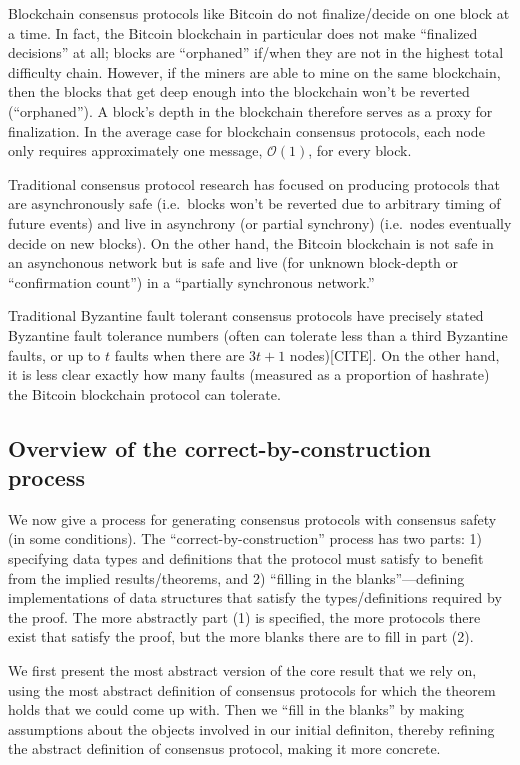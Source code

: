 \documentclass{article}
\theoremstyle{definition}
\begin{document}
Blockchain consensus protocols like Bitcoin do not finalize/decide on one block at a time. In fact, the Bitcoin blockchain in particular does not make ``finalized decisions'' at all; blocks are ``orphaned'' if/when they are not in the highest total difficulty chain. However, if the miners are able to mine on the same blockchain, then the blocks that get deep enough into the blockchain won't be reverted (``orphaned''). A block's depth in the blockchain therefore serves as a proxy for finalization. In the average case for blockchain consensus protocols, each node only requires approximately one message, $\mathcal{O}(1)$, for every block.

Traditional consensus protocol research has focused on producing protocols that are asynchronously safe (i.e.\ blocks won't be reverted due to arbitrary timing of future events) and live in asynchrony (or partial synchrony) (i.e.\ nodes eventually decide on new blocks). On the other hand, the Bitcoin blockchain is not safe in an asynchonous network but is safe and live (for unknown block-depth or ``confirmation count'') in a ``partially synchronous network.''

Traditional Byzantine fault tolerant consensus protocols have precisely stated Byzantine fault tolerance numbers (often can tolerate less than a third Byzantine faults, or up to $t$ faults when there are $3t + 1$ nodes)[CITE]. On the other hand, it is less clear exactly how many faults (measured as a proportion of hashrate) the Bitcoin blockchain protocol can tolerate.


\subsection{Overview of the correct-by-construction process}

We now give a process for generating consensus protocols with consensus safety (in some conditions). The ``correct-by-construction'' process has two parts: 1) specifying data types and definitions that the protocol must satisfy to benefit from the implied results/theorems, and 2) ``filling in the blanks''---defining implementations of data structures that satisfy the types/definitions required by the proof. The more abstractly part (1) is specified, the more protocols there exist that satisfy the proof, but the more blanks there are to fill in part (2).

We first present the most abstract version of the core result that we rely on, using the most abstract definition of consensus protocols for which the theorem holds that we could come up with. Then we ``fill in the blanks'' by making assumptions about the objects involved in our initial definiton, thereby refining the abstract definition of consensus protocol, making it more concrete.
\end{document}
